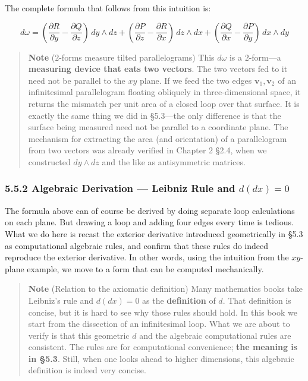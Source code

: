 \documentclass[a4paper,12pt,openany]{book}
\begin{document}
The complete formula that follows from this intuition is:

\[d\omega = (\frac{\partial R}{\partial y} - \frac{\partial Q}{\partial z})\,dy \wedge dz + (\frac{\partial P}{\partial z} - \frac{\partial R}{\partial x})\,dz \wedge dx + (\frac{\partial Q}{\partial x} - \frac{\partial P}{\partial y})\,dx \wedge dy\]

\begin{quote}
\textbf{Note} (\(2\)-forms measure tilted parallelograms) This
\(d\omega\) is a \(2\)-form—a
\textbf{measuring device that eats two vectors}. The two vectors fed to
it need not be parallel to the \(xy\) plane. If we feed the two edges
\(\mathbf{v}_1, \mathbf{v}_2\) of an infinitesimal parallelogram
floating obliquely in three-dimensional space, it returns the mismatch
per unit area of a closed loop over that surface. It is exactly the same
thing we did in §5.3—the only difference is that the surface being
measured need not be parallel to a coordinate plane. The mechanism for
extracting the area (and orientation) of a parallelogram from two
vectors was already verified in Chapter 2 §2.4, when we constructed
\(dy \wedge dz\) and the like as antisymmetric matrices.
\end{quote}

\hypertarget{algebraic-derivation-leibniz-rule-and-ddx0}{%
\subsubsection{\texorpdfstring{5.5.2 Algebraic Derivation — Leibniz
Rule and
\(d(dx)=0\)}{5.5.2 Algebraic Derivation — Leibniz Rule and d(dx)=0}}\label{algebraic-derivation-leibniz-rule-and-ddx0}}

The formula above can of course be derived by doing separate loop
calculations on each plane. But drawing a loop and adding four edges
every time is tedious. What we do here is recast the exterior derivative
introduced geometrically in §5.3 as computational algebraic rules, and
confirm that these rules do indeed reproduce the exterior derivative. In
other words, using the intuition from the \(xy\)-plane example, we move
to a form that can be computed mechanically.

\begin{quote}
\textbf{Note} (Relation to the axiomatic definition) Many mathematics
books take Leibniz's rule and \(d(dx)=0\) as the \textbf{definition} of
\(d\). That definition is concise, but it is hard to see why those rules
should hold. In this book we start from the dissection of an
infinitesimal loop. What we are about to verify is that this geometric
\(d\) and the algebraic computational rules are consistent. The rules
are for computational convenience; \textbf{the meaning is in §5.3}.
Still, when one looks ahead to higher dimensions, this algebraic
definition is indeed very concise.
\end{quote}
\end{document}
